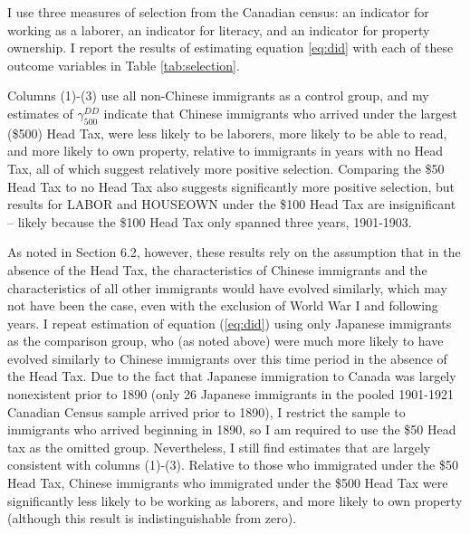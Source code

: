 I use three measures of selection from the Canadian census: an indicator for working as a laborer, an indicator for literacy, and an indicator for property ownership. I report the results of estimating equation \eqref{eq:did} with each of these outcome variables in Table \ref{tab:selection}.

Columns (1)-(3) use all non-Chinese immigrants as a control group, and my estimates of $\gamma_{500}^{DD}$ indicate that Chinese immigrants who arrived under the largest (\$500) Head Tax, were less likely to be laborers, more likely to be able to read, and more likely to own property, relative to immigrants in years with no Head Tax, all of which suggest relatively more positive selection. Comparing the \$50 Head Tax to no Head Tax also suggests significantly more positive selection, but results for LABOR and HOUSEOWN under the \$100 Head Tax are insignificant -- likely because the \$100 Head Tax only spanned three years, 1901-1903.

As noted in Section 6.2, however, these results rely on the assumption that in the absence of the Head Tax, the characteristics of Chinese immigrants and the characteristics of all other immigrants would have evolved similarly, which may not have been the case, even with the exclusion of World War I and following years. I repeat estimation of equation (\eqref{eq:did}) using only Japanese immigrants as the comparison group, who (as noted above) were much more likely to have evolved similarly to Chinese immigrants over this time period in the absence of the Head Tax. Due to the fact that Japanese immigration to Canada was largely nonexistent prior to 1890 (only 26 Japanese immigrants in the pooled 1901-1921 Canadian Census sample arrived prior to 1890), I restrict the sample to immigrants who arrived beginning in 1890, so I am required to use the \$50 Head tax as the omitted group. Nevertheless, I still find estimates that are largely consistent with columns (1)-(3).
Relative to those who immigrated under the \$50 Head Tax, Chinese immigrants who immigrated under the \$500 Head Tax were significantly less likely to be working as laborers, and more likely to own property (although this result is indistinguishable from zero). 

